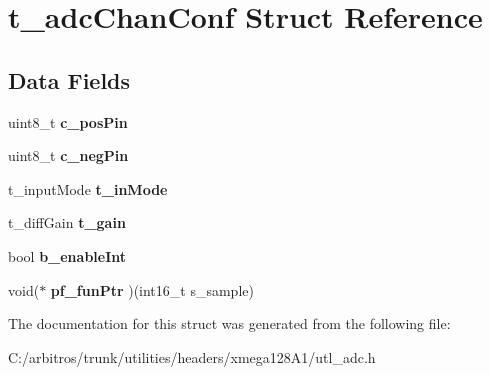 \hypertarget{structt__adc_chan_conf}{\section{t\-\_\-adc\-Chan\-Conf Struct Reference}
\label{structt__adc_chan_conf}
}
\subsection*{Data Fields}
\begin{DoxyCompactItemize}
\item 
\hypertarget{structt__adc_chan_conf_a7cc030ac8f699366c00c39ecf374c329}{uint8\-\_\-t {\bfseries c\-\_\-pos\-Pin}}\label{structt__adc_chan_conf_a7cc030ac8f699366c00c39ecf374c329}

\item 
\hypertarget{structt__adc_chan_conf_a91b82012399e28a2cbd397398946a86f}{uint8\-\_\-t {\bfseries c\-\_\-neg\-Pin}}\label{structt__adc_chan_conf_a91b82012399e28a2cbd397398946a86f}

\item 
\hypertarget{structt__adc_chan_conf_abdb8311beea49b3bd822f1b98dfc08c3}{t\-\_\-input\-Mode {\bfseries t\-\_\-in\-Mode}}\label{structt__adc_chan_conf_abdb8311beea49b3bd822f1b98dfc08c3}

\item 
\hypertarget{structt__adc_chan_conf_a142ba07e114d05a086296ac009a4bcf5}{t\-\_\-diff\-Gain {\bfseries t\-\_\-gain}}\label{structt__adc_chan_conf_a142ba07e114d05a086296ac009a4bcf5}

\item 
\hypertarget{structt__adc_chan_conf_aeb813e3541a49409efebed0794946b60}{bool {\bfseries b\-\_\-enable\-Int}}\label{structt__adc_chan_conf_aeb813e3541a49409efebed0794946b60}

\item 
\hypertarget{structt__adc_chan_conf_abf60fe278e4ec7ed455a81f8d270357a}{void($\ast$ {\bfseries pf\-\_\-fun\-Ptr} )(int16\-\_\-t s\-\_\-sample)}\label{structt__adc_chan_conf_abf60fe278e4ec7ed455a81f8d270357a}

\end{DoxyCompactItemize}


The documentation for this struct was generated from the following file\-:\begin{DoxyCompactItemize}
\item 
C\-:/arbitros/trunk/utilities/headers/xmega128\-A1/utl\-\_\-adc.\-h\end{DoxyCompactItemize}
